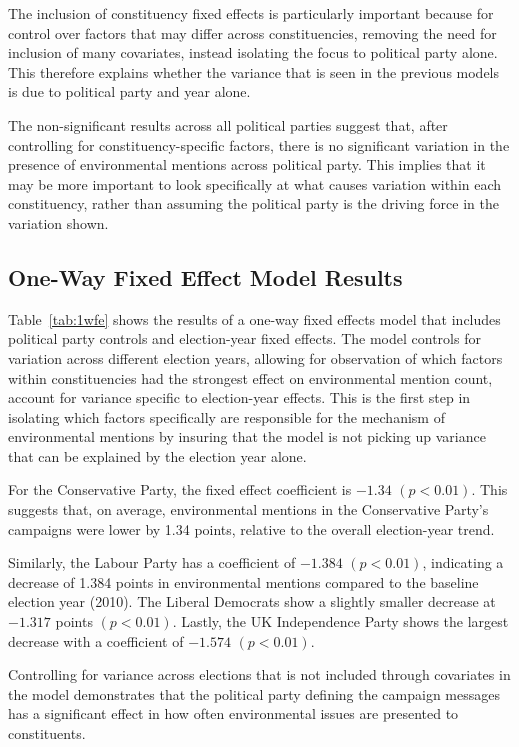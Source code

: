\documentclass[preprint]{elsarticle} %
\begin{document}
The inclusion of constituency fixed effects is particularly important because for control over factors that may differ across constituencies, removing the need for inclusion of many covariates, instead isolating the focus to political party alone. This therefore explains whether the variance that is seen in the previous models is due to political party and year alone.

The non-significant results across all political parties suggest that, after controlling for constituency-specific factors, there is no significant variation in the presence of environmental mentions across political party. This implies that it may be more important to look specifically at what causes variation within each constituency, rather than assuming the political party is the driving force in the variation shown.


\subsection{One-Way Fixed Effect Model Results}

Table~\ref{tab:1wfe} shows the results of a one-way fixed effects model that includes political party controls and election-year fixed effects. The model controls for variation across different election years, allowing for observation of which factors within constituencies had the strongest effect on environmental mention count, account for variance specific to election-year effects. This is the first step in isolating which factors specifically are responsible for the mechanism of environmental mentions by insuring that the model is not picking up variance that can be explained by the election year alone.

For the Conservative Party, the fixed effect coefficient is \(-1.34\) \((p < 0.01)\). This suggests that, on average, environmental mentions in the Conservative Party's campaigns were lower by 1.34 points, relative to the overall election-year trend.

Similarly, the Labour Party has a coefficient of \(-1.384\) \((p < 0.01)\), indicating a decrease of 1.384 points in environmental mentions compared to the baseline election year (2010). The Liberal Democrats show a slightly smaller decrease at \(-1.317\) points \((p < 0.01)\). Lastly, the UK Independence Party shows the largest decrease with a coefficient of \(-1.574\) \((p < 0.01)\).

Controlling for variance across elections that is not included through covariates in the model demonstrates that the political party defining the campaign messages has a significant effect in how often environmental issues are presented to constituents. 
\end{document}
